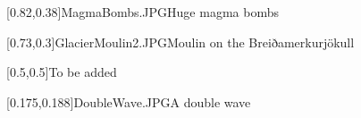 



\graphicspath{{Figures/}{Figures/Iceland/}}


\subtitle{Day 4}
\date{29.10.2020}


    
    [0.82,0.38]{MagmaBombs.JPG}{Huge magma bombs}
    
    [0.73,0.3]{GlacierMoulin2.JPG}{Moulin on the Breiðamerkurj\"okull}
    
    [0.5,0.5]{}{To be added}
    
    [0.175,0.188]{DoubleWave.JPG}{A double wave}
    
    

